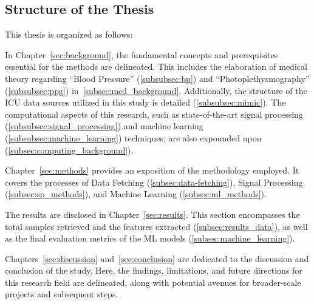 \subsection{Structure of the Thesis}
\label{subsec:structure}

This thesis is organized as follows:

In Chapter~\ref{sec:background}, the fundamental concepts and prerequisites essential for the methods are delineated.
This includes the elaboration of medical theory regarding \enquote{Blood Pressure} (\ref{subsubsec:bp}) and \enquote{Photoplethysmography} (\ref{subsubsec:ppg}) in~\ref{subsec:med_background}.
Additionally, the structure of the ICU data sources utilized in this study is detailed (\ref{subsubsec:mimic}).
The computational aspects of this research, such as state-of-the-art signal processing (\ref{subsubsec:signal_processing}) and machine learning (\ref{subsubsec:machine_learning}) techniques, are also expounded upon (\ref{subsec:computing_background}).

Chapter~\ref{sec:methods} provides an exposition of the methodology employed.
It covers the processes of Data Fetching (\ref{subsec:data-fetching}), Signal Processing (\ref{subsec:sp_methods}), and Machine Learning (\ref{subsec:ml_methods}).

The results are disclosed in Chapter~\ref{sec:results}.
This section encompasses the total samples retrieved and the features extracted (\ref{subsec:results_data}), as well as the final evaluation metrics of the ML models (\ref{subsec:machine_learning}).

Chapters~\ref{sec:discussion} and~\ref{sec:conclusion} are dedicated to the discussion and conclusion of the study.
Here, the findings, limitations, and future directions for this research field are delineated, along with potential avenues for broader-scale projects and subsequent steps.